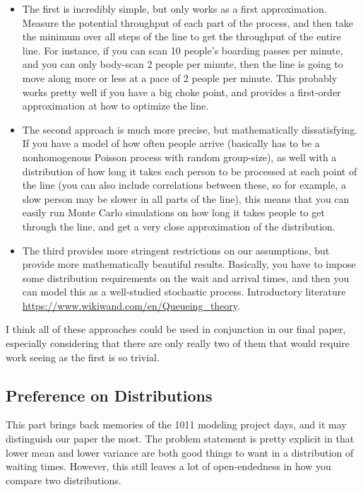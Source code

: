 \documentclass[]{article}
\begin{document}
\begin{itemize}
	\item The first is incredibly simple, but only works as a first approximation. Measure the potential throughput of each part of the process, and then take the minimum over all steps of the line to get the throughput of the entire line. For instance, if you can scan 10 people's boarding passes per minute, and you can only body-scan 2 people per minute, then the line is going to move along more or less at a pace of 2 people per minute. This probably works pretty well if you have a big choke point, and provides a first-order approximation at how to optimize the line.
	
	\item The second approach is much more precise, but mathematically dissatisfying. If you have a model of how often people arrive (basically has to be a nonhomogenous Poisson process with random group-size), as well with a distribution of how long it takes each person to be processed at each point of the line (you can also include correlations between these, so for example, a slow person may be slower in all parts of the line), this means that you can easily run Monte Carlo simulations on how long it takes people to get through the line, and get a very close approximation of the distribution.
	
	\item The third provides more stringent restrictions on our assumptions, but provide more mathematically beautiful results. Basically, you have to impose some distribution requirements on the wait and arrival times, and then you can model this as a well-studied stochastic process. Introductory literature \url{https://www.wikiwand.com/en/Queueing_theory}.
\end{itemize}

I think all of these approaches could be used in conjunction in our final paper, especially considering that there are only really two of them that would require work seeing as the first is so trivial.

\subsection{Preference on Distributions}

This part brings back memories of the 1011 modeling project days, and it may distinguish our paper the most. The problem statement is pretty explicit in that lower mean and lower variance are both good things to want in a distribution of waiting times. However, this still leaves a lot of open-endedness in how you compare two distributions. \medskip
\end{document}

